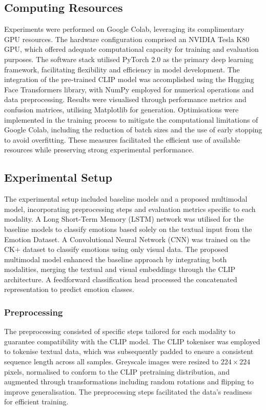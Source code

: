 \documentclass{article}
\theoremstyle{plain}
\theoremstyle{definition}
\theoremstyle{remark}
\begin{document}
\subsection{Computing Resources}
Experiments were performed on Google Colab, leveraging its complimentary GPU resources. The hardware configuration comprised an NVIDIA Tesla K80 GPU, which offered adequate computational capacity for training and evaluation purposes. The software stack utilised PyTorch 2.0 as the primary deep learning framework, facilitating flexibility and efficiency in model development. The integration of the pre-trained CLIP model was accomplished using the Hugging Face Transformers library, with NumPy employed for numerical operations and data preprocessing. Results were visualised through performance metrics and confusion matrices, utilising Matplotlib for generation. Optimisations were implemented in the training process to mitigate the computational limitations of Google Colab, including the reduction of batch sizes and the use of early stopping to avoid overfitting. These measures facilitated the efficient use of available resources while preserving strong experimental performance.

\subsection{Experimental Setup}
The experimental setup included baseline models and a proposed multimodal model, incorporating preprocessing steps and evaluation metrics specific to each modality. A Long Short-Term Memory (LSTM) network was utilised for the baseline models to classify emotions based solely on the textual input from the Emotion Dataset. A Convolutional Neural Network (CNN) was trained on the CK+ dataset to classify emotions using only visual data. The proposed multimodal model enhanced the baseline approach by integrating both modalities, merging the textual and visual embeddings through the CLIP architecture. A feedforward classification head processed the concatenated representation to predict emotion classes.
\subsubsection{Preprocessing}
The preprocessing consisted of specific steps tailored for each modality to guarantee compatibility with the CLIP model. The CLIP tokeniser was employed to tokenise textual data, which was subsequently padded to ensure a consistent sequence length across all samples. Greyscale images were resized to \(224 \times 224\) pixels, normalised to conform to the CLIP pretraining distribution, and augmented through transformations including random rotations and flipping to improve generalisation. The preprocessing steps facilitated the data's readiness for efficient training.
\end{document}
